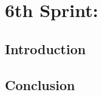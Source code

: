 \graphicspath{{./assets/}}
\setcounter{mtc}{5}
\chapter{ 6th Sprint: }

\minitoc
\newpage
\section*{Introduction}




\section*{Conclusion}
